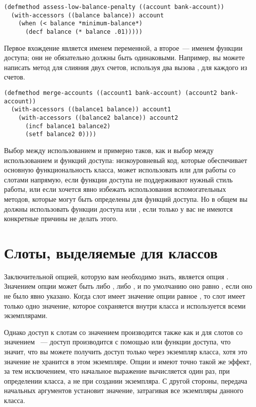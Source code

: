 \begin{lstlisting}
(defmethod assess-low-balance-penalty ((account bank-account))
  (with-accessors ((balance balance)) account
    (when (< balance *minimum-balance*)
      (decf balance (* balance .01)))))
\end{lstlisting}

Первое вхождение  является именем переменной, а второе~--- именем функции
доступа; они не обязательно должны быть одинаковыми.  Например, вы можете написать метод
для слияния двух счетов, используя два вызова , для каждого из
счетов.

\begin{lstlisting}
(defmethod merge-accounts ((account1 bank-account) (account2 bank-account))
  (with-accessors ((balance1 balance)) account1
    (with-accessors ((balance2 balance)) account2
      (incf balance1 balance2)
      (setf balance2 0))))
\end{lstlisting}

Выбор между использованием  и  примерно таков, как и
выбор между использованием  и функций доступа: низкоуровневый код,
которые обеспечивает основную функциональность класса, может использовать
 или  для работы со слотами напрямую, если функции
доступа не поддерживают нужный стиль работы, или если хочется явно избежать использования
вспомогательных методов, которые могут быть определены для функций доступа.  Но в общем вы
должны использовать функции доступа или , если только у вас не
имеются конкретные причины не делать этого.

\section{Слоты, выделяемые для классов}

Заключительной опцией, которую вам необходимо знать, является опция .
Значением опции  может быть либо , либо , и
по умолчанию оно равно , если оно не было явно указано.  Когда слот имеет
значение опции равное , то слот имеет только одно значение, которое
сохраняется внутри класса и используется всеми экземплярами.

Однако доступ к слотам со значением  производится также как и для слотов со
значением ~--- доступ производится с помощью  или функции
доступа, что значит, что вы можете получить доступ только через экземпляр класса, хотя это
значение не хранится в этом экземпляре.  Опции  и  имеют
точно такой же эффект, за тем исключением, что начальное выражение вычисляется один раз,
при определении класса, а не при создании экземпляра.  С другой стороны, передача
начальных аргументов  установит значение, затрагивая все экземпляры
данного класса.

